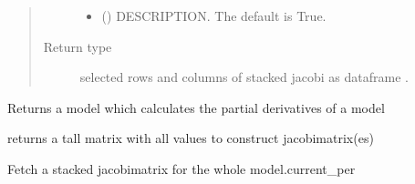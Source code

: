 \documentclass[letterpaper,10pt,english]{sphinxmanual}
\begin{document}
\begin{fulllineitems}
\begin{fulllineitems}
\begin{quote}
\begin{description}
\begin{itemize}
\item {} 
\sphinxAtStartPar
{} (\sphinxstyleliteralemphasis{\sphinxupquote{, }}) \textendash{} DESCRIPTION. The default is True.

\end{itemize}

\item[{Return type}] \leavevmode
\sphinxAtStartPar
selected rows and columns of stacked jacobi as dataframe .

\end{description}\end{quote}

\end{fulllineitems}


\begin{fulllineitems}
\label{\detokenize{index:modelnewton.newton_diff.get_diffmodel}}
\pysigstartsignatures
{}
\pysigstopsignatures
\sphinxAtStartPar
Returns a model which calculates the partial derivatives of a model

\end{fulllineitems}


\begin{fulllineitems}
\label{\detokenize{index:modelnewton.newton_diff.get_diff_melted}}
\pysigstartsignatures
{}
\pysigstopsignatures
\sphinxAtStartPar
returns a tall matrix with all values to construct jacobimatrix(es)

\end{fulllineitems}


\begin{fulllineitems}
\label{\detokenize{index:modelnewton.newton_diff.get_diff_mat_tot}}
\pysigstartsignatures
{}
\pysigstopsignatures
\sphinxAtStartPar
Fetch a stacked jacobimatrix for the whole model.current\_per


\end{fulllineitems}
\end{fulllineitems}
\end{document}
